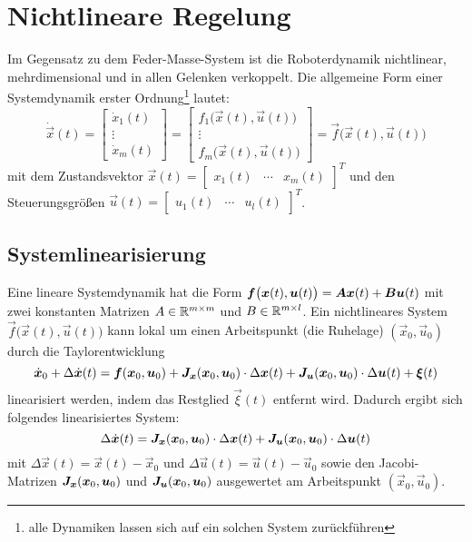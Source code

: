 \section{Nichtlineare Regelung}
	Im Gegensatz zu dem Feder-Masse-System ist die Roboterdynamik \iA nichtlinear, mehrdimensional und in allen Gelenken verkoppelt. Die allgemeine Form einer Systemdynamik erster Ordnung\footnote{alle Dynamiken lassen sich auf ein solchen System zurückführen} lautet:
	\begin{equation*}
		\dot{\vec{x}}(t) =
		\begin{bmatrix}
			\dot{x}_1(t) \\
			\vdots       \\
			\dot{x}_m(t)
		\end{bmatrix}
		=
		\begin{bmatrix}
			f_1\big(\vec{x}(t), \vec{u}(t)\big) \\
			\vdots                              \\
			f_m\big(\vec{x}(t), \vec{u}(t)\big)
		\end{bmatrix}
		= \vec{f}\big(\vec{x}(t), \vec{u}(t)\big)
	\end{equation*}
	mit dem Zustandsvektor \( \vec{x}(t) = \begin{bmatrix} x_1(t) & \cdots & x_m(t) \end{bmatrix}^T \) und den Steuerungsgrößen \( \vec{u}(t) = \begin{bmatrix} u_1(t) & \cdots & u_l(t) \end{bmatrix}^T \).

	\subsection{Systemlinearisierung}
		Eine lineare Systemdynamik hat die Form \( \bm{f}\big(\bm{x}(t), \bm{u}(t)\big) = \bm{A} \bm{x}(t) + \bm{B} \bm{u}(t) \) mit zwei konstanten Matrizen \( A \in \mathbb{R}^{m \times m} \) und \( B \in \mathbb{R}^{m \times l} \). Ein nichtlineares System \( \vec{f}\big(\vec{x}(t), \vec{u}(t)\big) \) kann lokal um einen Arbeitspunkt (\bspw die Ruhelage) \( (\vec{x}_0, \vec{u}_0) \) durch die Taylorentwicklung
		\begin{equation*}
			\dot{\bm{x}}_0 + \Delta\dot{\bm{x}}(t) = \bm{f}(\bm{x}_0, \bm{u}_0) + \bm{J}_{\bm{x}}(\bm{x}_0, \bm{u}_0) \cdot \Delta\bm{x}(t) + \bm{J}_{\bm{u}}(\bm{x}_0, \bm{u}_0) \cdot \Delta\bm{u}(t) + \bm{\xi}(t)
		\end{equation*}
		linearisiert werden, indem das Restglied \(\vec{\xi}(t)\) entfernt wird. Dadurch ergibt sich folgendes linearisiertes System:
		\begin{equation*}
			\Delta\dot{\bm{x}}(t) = \bm{J}_{\bm{x}}(\bm{x}_0, \bm{u}_0) \cdot \Delta\bm{x}(t) + \bm{J}_{\bm{u}}(\bm{x}_0, \bm{u}_0) \cdot \Delta\bm{u}(t)
		\end{equation*}
		mit \( \Delta\vec{x}(t) = \vec{x}(t) - \vec{x}_0 \) und \( \Delta\vec{u}(t) = \vec{u}(t) - \vec{u}_0 \) sowie den Jacobi-Matrizen \( \bm{J}_{\bm{x}}(\bm{x}_0, \bm{u}_0) \) und \( \bm{J}_{\bm{u}}(\bm{x}_0, \bm{u}_0) \) ausgewertet am Arbeitspunkt \( (\vec{x}_0, \vec{u}_0) \).

